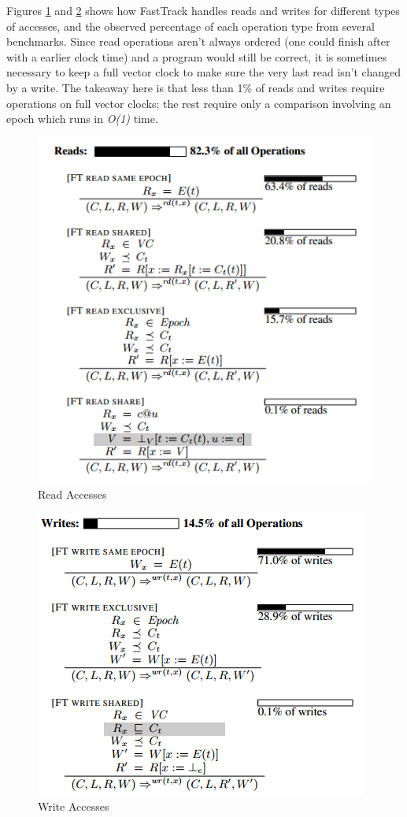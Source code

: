 \documentclass{acm_proc_article-sp}
\begin{document}
Figures \ref{read} and \ref{write} shows how FastTrack handles reads and writes for different types of accesses, and the observed percentage of each operation type from several benchmarks. Since read operations aren't always ordered (one could finish after with a earlier clock time) and a program would still be correct, it is sometimes necessary to keep a full vector clock to make sure the very last read isn't changed by a write. The takeaway here is that less than 1\% of reads and writes require operations on full vector clocks; the rest require only a comparison involving an epoch which runs in \emph{O(1)} time. 

 \begin{figure}[h]
    \centering
    \includegraphics[scale=.4]{fast_read_new}
	\caption{Read Accesses\label{read}}
 \end{figure}
\begin{figure}[h]
	\centering
    \includegraphics[scale=.4]{fast_write_new}
\caption{Write Accesses\label{write}}
  \end{figure}
\end{document}
